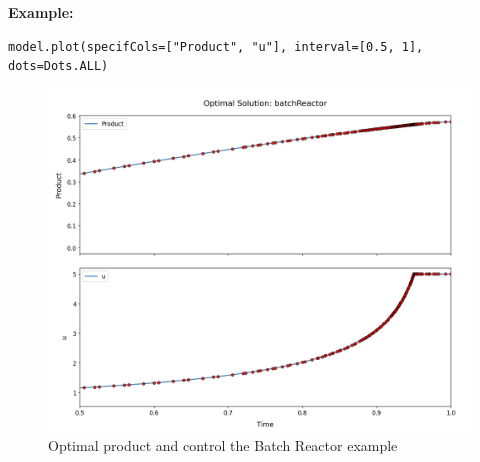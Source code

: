 \documentclass[12pt]{article}
\begin{document}
\begin{mdframed}[backgroundcolor=gray!10, roundcorner=10pt,
		linewidth=1pt]
			\textbf{Example:} 	\begin{lstlisting}
model.plot(specifCols=["Product", "u"], interval=[0.5, 1], dots=Dots.ALL)
					\end{lstlisting}
\begin{figure}[H]
	\centering
	\includegraphics[width=1\textwidth]{images/plotstd.png}
	\caption{Optimal product and control the Batch Reactor example}
	\label{fig:batch}
\end{figure}
	
\end{mdframed}
\end{document}
